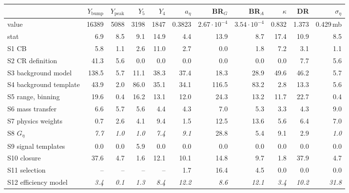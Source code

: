 \begin{tabular}{lrrrrrrrrrr}
\toprule
 & $Y_\mathrm{bump}$ & $Y_\mathrm{peak}$ & $Y_5$ & $Y_4$ & $a_\eta$ & BR$_G$ & BR$_A$ & $\kappa$ & DR & $\sigma_\eta$ \\
\midrule
value & 16389 & 5088 & 3198 & 1847 & 0.3823 & $2.67\cdot10^{-4}$ & $3.54\cdot10^{-4}$ & 0.832 & 1.373 & 0.429\,mb \\
stat & 6.9 & 8.5 & 9.1 & 14.9 & 4.4 & 13.9 & 8.7 & 17.4 & 10.9 & 8.5 \\
\midrule
S1 CB & 5.8 & 1.1 & 2.6 & 11.0 & 2.7 & 0.0 & 1.8 & 7.2 & 3.1 & 1.1 \\
S2 CR definition & 41.3 & 5.6 & 0.0 & 0.0 & 0.0 & 0.0 & 0.0 & 0.0 & 7.7 & 5.6 \\
S3 background model & 138.5 & 5.7 & 11.1 & 38.3 & 37.4 & 18.3 & 28.9 & 49.6 & 46.2 & 5.7 \\
S4 background template & 43.9 & 2.0 & 86.0 & 35.1 & 34.1 & 116.5 & 83.2 & 2.8 & 13.3 & 5.6 \\
S5 range, binning & 19.6 & 0.4 & 16.2 & 13.1 & 12.0 & 24.3 & 13.2 & 11.7 & 22.7 & 0.4 \\
S6 mass transfer & 6.6 & 5.7 & 5.6 & 4.4 & 4.3 & 7.0 & 5.3 & 3.3 & 4.3 & 9.0 \\
S7 physics weights & 0.7 & 2.6 & 4.1 & 9.4 & 1.5 & 12.5 & 13.6 & 5.6 & 6.4 & 7.0 \\
S8 $G_\eta$ & \textit{7.7} & \textit{1.0} & \textit{1.0} & \textit{7.4} & \textit{9.1} & 28.8 & 5.4 & 9.1 & 2.9 & \textit{1.0} \\
S9 signal templates & 0.0 & 0.0 & 5.9 & 0.0 & 0.0 & 0.0 & 0.0 & 0.0 & 0.0 & 0.0 \\
S10 closure & 37.6 & 4.7 & 1.6 & 12.1 & 10.1 & 14.8 & 9.7 & 1.8 & 37.9 & 4.7 \\
S11 selection & -- & -- & -- & -- & 1.7 & 16.4 & 4.5 & 0.0 & 0.0 & 0.0 \\
S12 efficiency model & \textit{3.4} & \textit{0.1} & \textit{1.3} & \textit{8.4} & \textit{12.2} & \textit{8.6} & \textit{12.1} & \textit{3.4} & \textit{10.2} & \textit{31.8} \\

\end{tabular}
